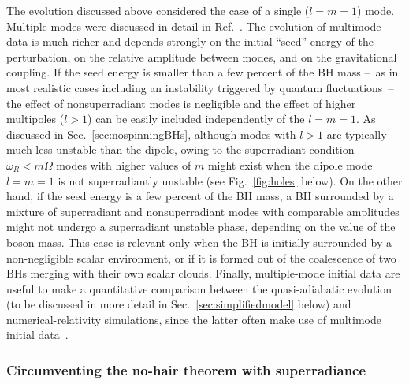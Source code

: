 \documentclass[11pt]{article}
\numberwithin{equation}{section} %
\begin{document}
The evolution discussed above considered the case of a single ($l=m=1$) mode. Multiple modes were discussed in detail in Ref.~\cite{Ficarra:2018rfu}. The evolution of multimode data is much richer and depends strongly on the initial ``seed'' energy of the perturbation, on the relative amplitude between modes, and on the gravitational coupling. If the seed energy is smaller than a few percent of
the BH mass --~as in most realistic cases including an instability triggered by quantum fluctuations~-- the effect of nonsuperradiant modes is negligible and the effect of higher multipoles ($l>1$) can be easily included independently of the $l=m=1$. As discussed in Sec.~\ref{sec:nospinningBHs}, although modes with $l>1$ are typically much less unstable than the dipole, owing to the superradiant condition $\omega_R<m\Omega$ modes with higher values of $m$ might exist when the dipole mode $l=m=1$ is not superradiantly unstable (see Fig.~\ref{fig:holes} below).
%
On the other hand, if the seed energy is a few percent of
the BH mass, a BH surrounded by a mixture of superradiant and nonsuperradiant modes with comparable amplitudes might not undergo a superradiant unstable phase, depending on the value of the boson mass. This case is relevant only when the BH is initially surrounded by a non-negligible scalar environment, or if it is formed out of the coalescence of two BHs merging with their own scalar clouds. Finally, multiple-mode initial data are useful to make a quantitative comparison between the quasi-adiabatic evolution (to be discussed in more detail in Sec.~\ref{sec:simplifiedmodel} below) and numerical-relativity simulations, since the latter often make use of multimode initial data~\cite{Okawa:2014nda,East:2017mrj,East:2018glu}.

\subsubsection{Circumventing the no-hair theorem with superradiance}\label{sec:hair}
\end{document}
